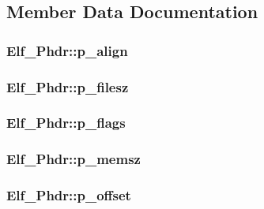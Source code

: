 \subsection{Member Data Documentation}
\hypertarget{struct_elf___phdr_a62df4dfc2433886f85e6b443f1e1a9f4}{
\subsubsection[{p\+\_\+align}]{ Elf\+\_\+\+Phdr\+::p\+\_\+align}}\label{struct_elf___phdr_a62df4dfc2433886f85e6b443f1e1a9f4}
\hypertarget{struct_elf___phdr_a5dc93e17daa09e66ccd21dcaaf51c507}{
\subsubsection[{p\+\_\+filesz}]{ Elf\+\_\+\+Phdr\+::p\+\_\+filesz}}\label{struct_elf___phdr_a5dc93e17daa09e66ccd21dcaaf51c507}
\hypertarget{struct_elf___phdr_a753c26d1604405674dc8a813f1d1dcd1}{
\subsubsection[{p\+\_\+flags}]{ Elf\+\_\+\+Phdr\+::p\+\_\+flags}}\label{struct_elf___phdr_a753c26d1604405674dc8a813f1d1dcd1}
\hypertarget{struct_elf___phdr_aef06a5f4e9ed8d8f509d8542a12efd79}{
\subsubsection[{p\+\_\+memsz}]{ Elf\+\_\+\+Phdr\+::p\+\_\+memsz}}\label{struct_elf___phdr_aef06a5f4e9ed8d8f509d8542a12efd79}
\hypertarget{struct_elf___phdr_a2b1e0d55f2c1d55fd12588a0be1e2897}{
\subsubsection[{p\+\_\+offset}]{ Elf\+\_\+\+Phdr\+::p\+\_\+offset}}\label{struct_elf___phdr_a2b1e0d55f2c1d55fd12588a0be1e2897}
